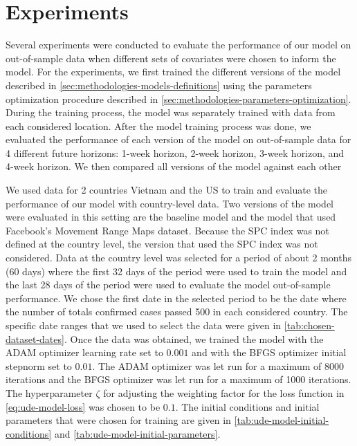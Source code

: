 \section{Experiments}

Several experiments were conducted to evaluate the performance of our model on out-of-sample data when different sets of covariates were chosen to inform the model.
For the experiments, we first trained the different versions of the model described in \autoref{sec:methodologies-models-definitions} using the parameters optimization procedure described in \autoref{sec:methodologies-parameters-optimization}.
During the training process, the model was separately trained with data from each considered location.
After the model training process was done, we evaluated the performance of each version of the model on out-of-sample data for 4 different future horizons: 1-week horizon, 2-week horizon, 3-week horizon, and 4-week horizon.
We then compared all versions of the model against each other

We used data for 2 countries Vietnam and the \gls{US} to train and evaluate the performance of our model with country-level data.
Two versions of the model were evaluated in this setting are the baseline model and the model that used Facebook's Movement Range Maps dataset.
Because the \gls{SPC} index was not defined at the country level, the version that used the \gls{SPC} index was not considered.
Data at the country level was selected for a period of about 2 months (60 days) where the first 32 days of the period were used to train the model and the last 28 days of the period were used to evaluate the model out-of-sample performance.
We chose the first date in the selected period to be the date where the number of totals confirmed cases passed 500 in each considered country.
The specific date ranges that we used to select the data were given in \autoref{tab:chosen-dataset-dates}.
Once the data was obtained, we trained the model with the ADAM optimizer learning rate set to $0.001$ and with the BFGS optimizer initial stepnorm set to $0.01$.
The ADAM optimizer was let run for a maximum of 8000 iterations and the BFGS optimizer was let run for a maximum of 1000 iterations.
The hyperparameter $\zeta$ for adjusting the weighting factor for the loss function in \autoref{eq:ude-model-loss} was chosen to be $0.1$.
The initial conditions and initial parameters that were chosen for training are given in \autoref{tab:ude-model-initial-conditions} and \autoref{tab:ude-model-initial-parameters}.

